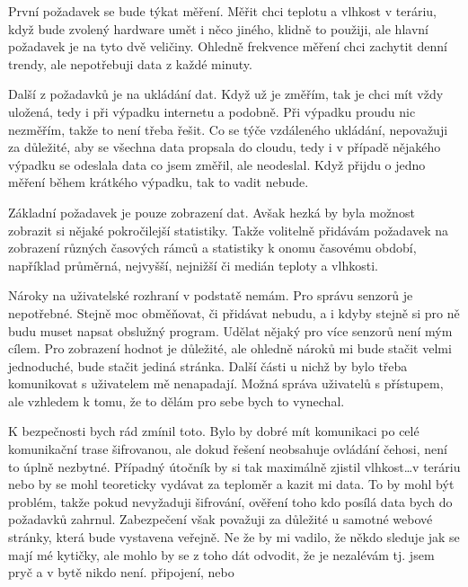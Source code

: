 
První požadavek se bude týkat měření. Měřit chci teplotu a vlhkost v teráriu, když bude zvolený hardware umět i něco 
jiného, klidně to použiji, ale hlavní požadavek je na tyto dvě veličiny. Ohledně frekvence měření chci zachytit denní 
trendy, ale nepotřebuji data z každé minuty.

Další z požadavků je na ukládání dat. Když už je změřím, tak je chci mít vždy uložená, tedy i při výpadku internetu 
a podobně. Při výpadku proudu nic nezměřím, takže to není třeba řešit. Co se týče vzdáleného ukládání, nepovažuji za 
důležité, aby se všechna data propsala do cloudu, tedy i v případě nějakého výpadku se odeslala data co jsem změřil, ale 
neodeslal. Když přijdu o jedno měření během krátkého výpadku, tak to vadit nebude.%

Základní požadavek je pouze zobrazení dat. Avšak hezká by byla možnost zobrazit si nějaké pokročilejší statistiky. Takže 
volitelně přidávám požadavek na zobrazení různých časových rámců a statistiky k onomu časovému období, například 
průměrná, nejvyšší, nejnižší či medián teploty a vlhkosti.%

Nároky na uživatelské rozhraní v podstatě nemám. Pro správu senzorů je nepotřebné. Stejně moc obměňovat, či přidávat 
nebudu, a i kdyby stejně si  pro ně budu muset napsat obslužný program. Udělat nějaký  pro 
více senzorů není mým cílem. Pro zobrazení hodnot je důležité, ale ohledně nároků mi bude stačit velmi jednoduché, bude 
stačit jediná stránka. Další části u nichž by bylo třeba komunikovat s uživatelem mě nenapadají. Možná správa uživatelů 
s přístupem, ale vzhledem k tomu, že to dělám pro sebe bych to vynechal.

K bezpečnosti bych rád zmínil toto. Bylo by dobré mít komunikaci po celé komunikační trase šifrovanou, ale dokud řešení 
neobsahuje ovládání čehosi, není to úplně nezbytné. Případný útočník by si tak maximálně zjistil vlhkost\ldots v teráriu
nebo by se mohl teoreticky vydávat za teploměr a kazit mi data. To by mohl být problém, takže pokud nevyžaduji 
šifrování, ověření toho kdo posílá data bych do požadavků zahrnul. Zabezpečení však považuji za důležité u samotné 
webové stránky, která bude vystavena veřejně. Ne že by mi vadilo, že někdo sleduje jak se mají mé kytičky, ale mohlo by 
se z toho dát odvodit, že je nezalévám tj. jsem pryč a v bytě nikdo není.%
připojení, nebo 

